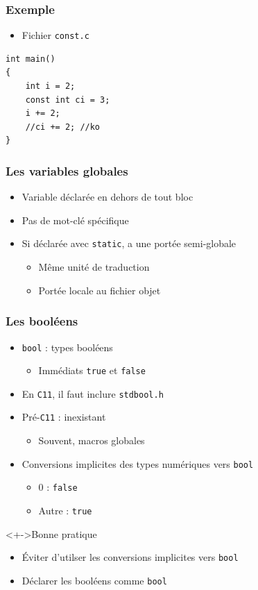 \begin{frame}[containsverbatim]
\frametitle{Exemple}
\begin{itemize}
\item Fichier \texttt{const.c}
\end{itemize}
\begin{lstlisting}
int main()
{
	int i = 2;
	const int ci = 3;
	i += 2;
	//ci += 2; //ko
}
\end{lstlisting}
\end{frame}

\begin{frame}
\frametitle{Les variables globales}
\begin{itemize}[<+->]
\item Variable déclarée en dehors de tout bloc
\item Pas de mot-clé spécifique
\item Si déclarée avec \lstinline|static|, a une portée semi-globale
	\begin{itemize}
	\item Même unité de traduction
	\item Portée locale au fichier objet
	\end{itemize}
\end{itemize}
\end{frame}

\begin{frame}
\frametitle{Les booléens}
\begin{itemize}[<+->]
\item \lstinline|bool| : types booléens
	\begin{itemize}
	\item Immédiats \lstinline|true| et \lstinline|false|	
	\end{itemize}
\item En \texttt{C11}, il faut inclure \texttt{stdbool.h}
\item Pré-\texttt{C11} : inexistant
	\begin{itemize}	
	\item Souvent, macros globales
	\end{itemize}
\item Conversions implicites des types numériques vers \lstinline|bool|
	\begin{itemize}
	\item $0$ : \lstinline|false|
	\item Autre : \lstinline|true|
	\end{itemize}
\end{itemize}
\begin{exampleblock}<+->{Bonne pratique}
	\begin{itemize}[<+->]
	\item Éviter d'utilser les conversions implicites vers \lstinline|bool|
	\item Déclarer les booléens comme \lstinline|bool|
	\end{itemize}
\end{exampleblock}
\end{frame}

